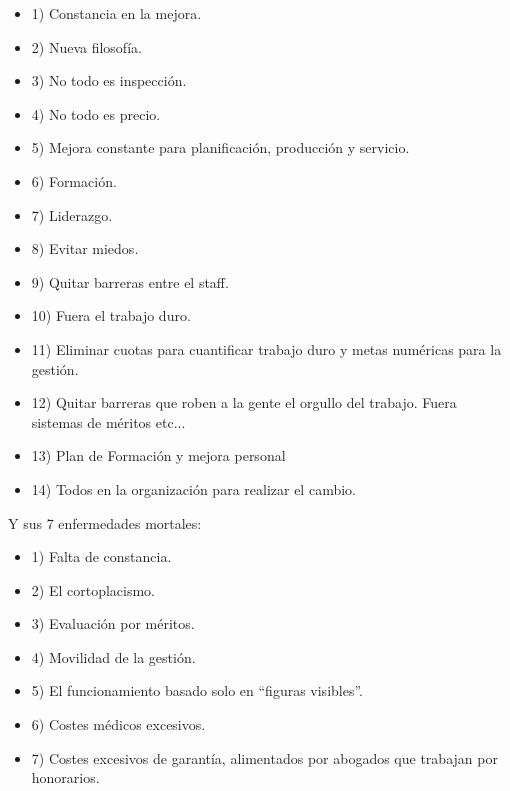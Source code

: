 \documentclass[oneside]{book}
\begin{document}
\begin{itemize} \item 1) Constancia en la mejora. \item  2) Nueva filosofía. \item  3) No todo es inspección.  \item 4) No todo es precio. \item  5) Mejora constante para planificación, producción y servicio. \item 6) Formación. \item 7) Liderazgo. \item 8) Evitar miedos. \item 9) Quitar barreras entre el staff. \item 10) Fuera el trabajo duro. \item 11) Eliminar cuotas para cuantificar trabajo duro y metas numéricas para la gestión. \item 12) Quitar barreras que roben a la gente el orgullo del trabajo. Fuera sistemas de méritos etc... \item 13) Plan de Formación y mejora personal \item 14) Todos en la organización para realizar el cambio. \end{itemize}  Y sus 7 enfermedades mortales: \begin{itemize} \item 1) Falta de constancia. \item 2) El cortoplacismo. \item 3) Evaluación por méritos. \item 4) Movilidad de la gestión. \item 5) El funcionamiento basado solo en ``figuras visibles''. \item 6) Costes médicos excesivos. \item 7) Costes excesivos de garantía, alimentados por abogados que trabajan por honorarios. \end{itemize}
\end{document}
